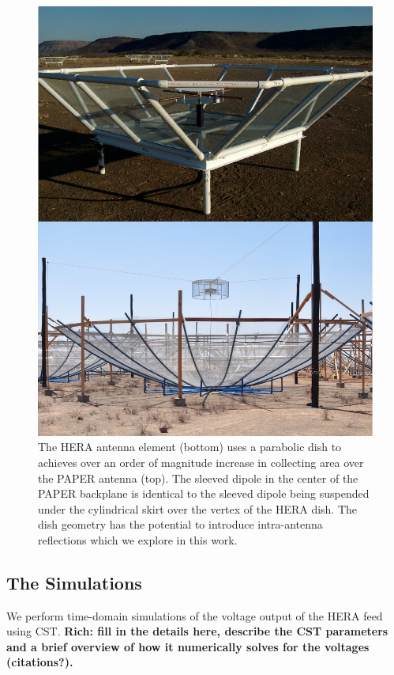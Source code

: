 \documentclass[twocolumn]{emulateapj}
\begin{document}
\begin{figure}
\includegraphics[width=.5\textwidth]{figures/PAPER_HERA_compare.jpg}
\caption{The HERA antenna element (bottom) uses a parabolic dish to achieves over an order of magnitude increase in collecting area over the PAPER antenna (top). The sleeved dipole in the center of the PAPER backplane is identical to the sleeved dipole being suspended under the cylindrical skirt over the vertex of the HERA dish. The dish geometry has the potential to introduce intra-antenna reflections which we explore in this work.}
\label{fig:AntennaCompare}
\end{figure}




\subsection{The Simulations}\label{ssec:Simulations}
We perform time-domain simulations of the voltage output of the HERA feed using CST. {\bf \color{red} Rich: fill in the details here, describe the CST parameters and a brief overview of how it numerically solves for the voltages (citations?).  }
\end{document}
